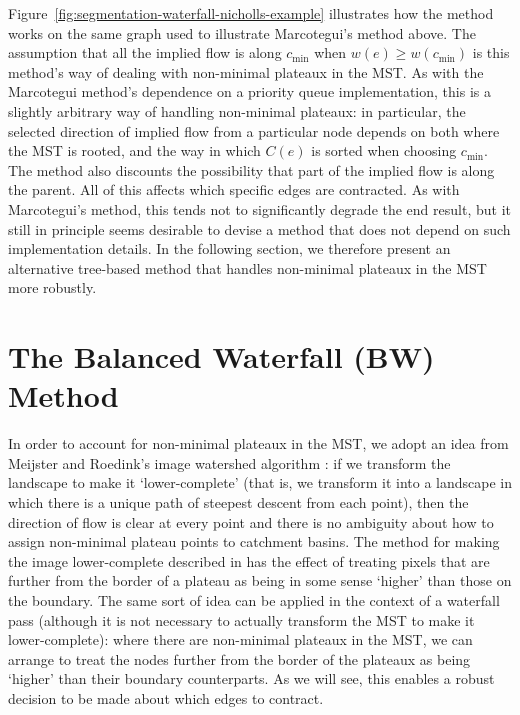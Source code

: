 \documentclass[preprint,a4paper]{elsarticle}
\begin{document}
%
Figure~\ref{fig:segmentation-waterfall-nicholls-example} illustrates how the method works on the same graph used to illustrate Marcotegui's method above. The assumption that all the implied flow is along $c_{\min}$ when $w(e) \ge w(c_{\min})$ is this method's way of dealing with non-minimal plateaux in the MST. As with the Marcotegui method's dependence on a priority queue implementation, this is a slightly arbitrary way of handling non-minimal plateaux: in particular, the selected direction of implied flow from a particular node depends on both where the MST is rooted, and the way in which $C(e)$ is sorted when choosing $c_{\min}$. The method also discounts the possibility that part of the implied flow is along the parent. All of this affects which specific edges are contracted. As with Marcotegui's method, this tends not to significantly degrade the end result, but it still in principle seems desirable to devise a method that does not depend on such implementation details. In the following section, we therefore present an alternative tree-based method that handles non-minimal plateaux in the MST more robustly.

\section{The Balanced Waterfall (BW) Method}
\label{sec:golodetz}

In order to account for non-minimal plateaux in the MST, we adopt an idea from Meijster and Roedink's image watershed algorithm \cite{meijster98}: if we transform the landscape to make it `lower-complete' (that is, we transform it into a landscape in which there is a unique path of steepest descent from each point), then the direction of flow is clear at every point and there is no ambiguity about how to assign non-minimal plateau points to catchment basins. The method for making the image lower-complete described in \cite{meijster98} has the effect of treating pixels that are further from the border of a plateau as being in some sense `higher' than those on the boundary. The same sort of idea can be applied in the context of a waterfall pass (although it is not necessary to actually transform the MST to make it lower-complete): where there are non-minimal plateaux in the MST, we can arrange to treat the nodes further from the border of the plateaux as being `higher' than their boundary counterparts. As we will see, this enables a robust decision to be made about which edges to contract.
\end{document}
